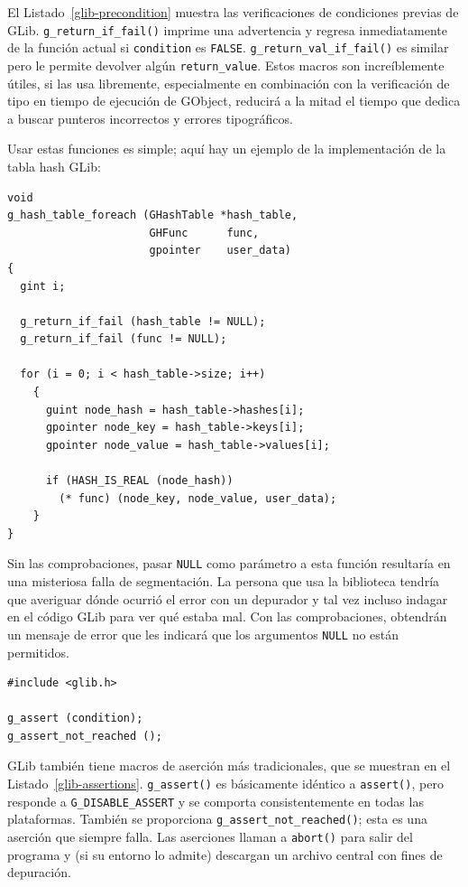 El Listado~\ref{glib-precondition} muestra las verificaciones de condiciones previas de GLib. \lstinline{g_return_if_fail()} imprime una advertencia y regresa inmediatamente de la función actual si \lstinline{condition} es \lstinline{FALSE}. \lstinline{g_return_val_if_fail()} es similar pero le permite devolver algún \lstinline{return_value}. Estos macros son increíblemente útiles, si las usa libremente, especialmente en combinación con la verificación de tipo en tiempo de ejecución de GObject, %
reducirá a la mitad el tiempo que dedica a buscar punteros incorrectos y errores tipográficos.

Usar estas funciones es simple; aquí hay un ejemplo de la implementación de la tabla hash GLib:
\begin{lstlisting}[style=GLib/GTK]
void
g_hash_table_foreach (GHashTable *hash_table,
                      GHFunc      func,
                      gpointer    user_data)
{
  gint i;

  g_return_if_fail (hash_table != NULL);
  g_return_if_fail (func != NULL);

  for (i = 0; i < hash_table->size; i++)
    {
      guint node_hash = hash_table->hashes[i];
      gpointer node_key = hash_table->keys[i];
      gpointer node_value = hash_table->values[i];

      if (HASH_IS_REAL (node_hash))
        (* func) (node_key, node_value, user_data);
    }
}
\end{lstlisting}

Sin las comprobaciones, pasar \lstinline{NULL} como parámetro a esta función resultaría en una misteriosa falla de segmentación. La persona que usa la biblioteca tendría que averiguar dónde ocurrió el error con un depurador y tal vez incluso indagar en el código GLib para ver qué estaba mal. Con las comprobaciones, obtendrán un mensaje de error que les indicará que los argumentos \lstinline{NULL} no están permitidos.

\begin{lstlisting}[style=GLib/GTK, caption={Aserciones}, label=glib-assertions]
#include <glib.h>

g_assert (condition);
g_assert_not_reached ();
\end{lstlisting}

GLib también tiene macros de aserción más tradicionales, que se muestran en el Listado~\ref{glib-assertions}. \lstinline{g_assert()} es básicamente idéntico a \lstinline{assert()}, pero responde a \lstinline{G_DISABLE_ASSERT} y se comporta consistentemente en todas las plataformas. También se proporciona \lstinline{g_assert_not_reached()}; esta es una aserción que siempre falla. Las aserciones llaman a \lstinline{abort()} para salir del programa y (si su entorno lo admite) descargan un archivo central con fines de depuración.

